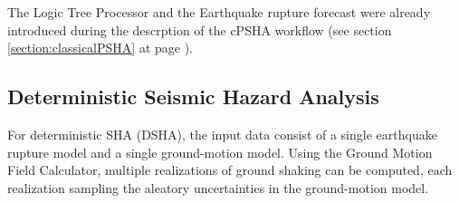 The Logic Tree Processor and the Earthquake rupture forecast were already 
introduced during the descrption of the cPSHA workflow (see section 
\ref{section:classicalPSHA} at page \pageref{section:classicalPSHA}).
%
\subsection{Deterministic Seismic Hazard Analysis}
\label{section:deterministicSHA}
For deterministic SHA (DSHA), the input data consist of a single earthquake 
rupture model and a single ground-motion model. Using the Ground Motion Field 
Calculator, multiple realizations of ground shaking can be computed, each 
realization sampling the aleatory uncertainties in the ground-motion model.


